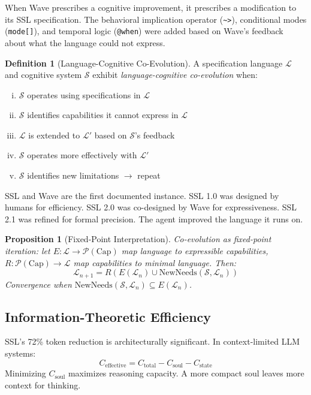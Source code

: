 \documentclass[12pt,a4paper]{article}
\theoremstyle{plain}
\newtheorem{proposition}[theorem]{Proposition}
\theoremstyle{definition}
\newtheorem{definition}[theorem]{Definition}
\theoremstyle{remark}
\begin{document}
When Wave prescribes a cognitive improvement, it prescribes a modification to its SSL specification. The behavioral implication operator (\texttt{\~{}>}), conditional modes (\texttt{mode[]}), and temporal logic (\texttt{@when}) were added based on Wave's feedback about what the language could not express.

\begin{definition}[Language-Cognitive Co-Evolution]
\label{def:coevolution}
A specification language $\mathcal{L}$ and cognitive system $\mathcal{S}$ exhibit \emph{language-cognitive co-evolution} when:
\begin{enumerate}[(i),nosep]
\item $\mathcal{S}$ operates using specifications in $\mathcal{L}$
\item $\mathcal{S}$ identifies capabilities it cannot express in $\mathcal{L}$
\item $\mathcal{L}$ is extended to $\mathcal{L}'$ based on $\mathcal{S}$'s feedback
\item $\mathcal{S}$ operates more effectively with $\mathcal{L}'$
\item $\mathcal{S}$ identifies new limitations $\to$ repeat
\end{enumerate}
\end{definition}

SSL and Wave are the first documented instance. SSL 1.0 was designed by humans for efficiency. SSL 2.0 was co-designed by Wave for expressiveness. SSL 2.1 was refined for formal precision. The agent improved the language it runs on.

\begin{proposition}[Fixed-Point Interpretation]
\label{prop:fixedpoint}
Co-evolution as fixed-point iteration: let $E: \mathcal{L} \to \mathcal{P}(\text{Cap})$ map language to expressible capabilities, $R: \mathcal{P}(\text{Cap}) \to \mathcal{L}$ map capabilities to minimal language. Then:
\[
\mathcal{L}_{n+1} = R\!\left(E(\mathcal{L}_n) \cup \text{NewNeeds}(\mathcal{S}, \mathcal{L}_n)\right)
\]
Convergence when $\text{NewNeeds}(\mathcal{S}, \mathcal{L}_n) \subseteq E(\mathcal{L}_n)$.
\end{proposition}

\subsection{Information-Theoretic Efficiency}

SSL's 72\% token reduction is architecturally significant. In context-limited LLM systems:
\[
C_{\text{effective}} = C_{\text{total}} - C_{\text{soul}} - C_{\text{state}}
\]
Minimizing $C_{\text{soul}}$ maximizes reasoning capacity. A more compact soul leaves more context for thinking.
\end{document}
